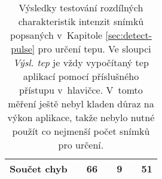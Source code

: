 \documentclass[
  digital, %
  table,   %
%
  lof,     %
  lot,     %
]{fithesis3}
\begin{document}
\begin{table}
{\begin{tabular}{@{}rrrrrrr@{}}
Součet chyb &                             & 66                           &                              & 9                              &                         & 51                        \\ \bottomrule
\end{tabular}}
\caption{Výsledky testování rozdílných charakteristik intenzit snímků popsaných v~Kapitole \ref{sec:detect-pulse} pro určení tepu. Ve sloupci \emph{Výsl. tep} je vždy vypočítaný tep aplikací pomocí příslušného přístupu v~hlavičce. V~tomto měření ještě nebyl kladen důraz na výkon aplikace, takže nebylo nutné použít co nejmenší počet snímků pro určení.}
\end{table}

\begin{table}
\label{tab:bpm-roi-type}
\caption{Výsledky ovlivnění výsledků při určení masky pro výpočet intenzit snímků. Princip byl popsán v~Kapitole \ref{sec:detection}. Hodnoty ilustrují situace, kdy je pro výpočet intenzit využit nejdříve celý snímek, potom oblast detekovaného obličeje a nakonec čela.}
\end{table}
\end{document}

